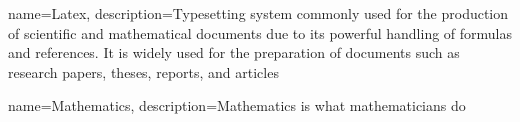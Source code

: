 {
    name=Latex,
    description={Typesetting system commonly used for the production of scientific and mathematical documents due to its powerful handling of formulas and references. It is widely used for the preparation of documents such as research papers, theses, reports, and articles}
}

{
    name=Mathematics,
    description={Mathematics is what mathematicians do}
}